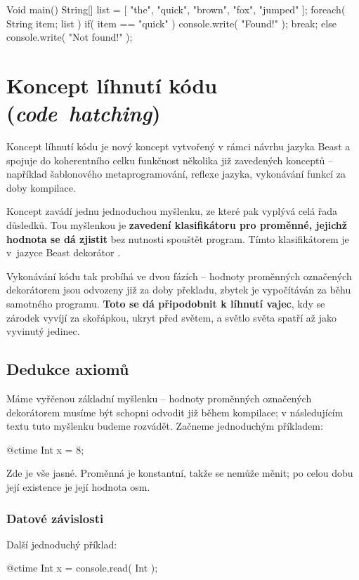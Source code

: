 \begin{code}
Void main() {
	String[] list = [ "the", "quick", "brown", "fox", "jumped" ];
	foreach( String item; list ) {
		if( item == "quick" )	{
			console.write( "Found!" );
			break;
		}
	} else
		console.write( "Not found!" );
}
\end{code}

\chapter{Koncept líhnutí kódu (\textit{code~hatching})} \label{ctime}
Koncept líhnutí kódu je nový koncept vytvořený v rámci návrhu jazyka Beast a spojuje do koherentního celku funkčnost několika již zavedených konceptů -- například šablonového metaprogramování, reflexe jazyka, vykonávání funkcí za doby kompilace.

Koncept zavádí jednu jednoduchou myšlenku, ze které pak vyplývá celá řada důsledků. Tou myšlenkou je \textbf{zavedení klasifikátoru pro proměnné, jejichž hodnota se dá zjistit} bez nutnosti spouštět program. Tímto klasifikátorem je v~jazyce Beast dekorátor \ctime.

Vykonávání kódu tak probíhá ve dvou fázích -- hodnoty proměnných označených dekorátorem \ctime jsou odvozeny již za doby překladu, zbytek je vypočítáván za běhu samotného programu. \textbf{Toto se dá připodobnit k líhnutí vajec}, kdy se zárodek vyvíjí za skořápkou, ukryt před světem, a světlo světa spatří až jako vyvinutý jedinec.

\section{Dedukce axiomů}
Máme vyřčenou základní myšlenku -- hodnoty proměnných označených dekorátorem \ctime musíme být schopni odvodit již během kompilace; v následujícím textu tuto myšlenku budeme rozvádět. Začneme jednoduchým příkladem:
\begin{code}
@ctime Int x = 8;
\end{code}

Zde je vše jasné. Proměnná je konstantní, takže se nemůže měnit; po celou dobu její existence je její hodnota osm.

\subsection{Datové závislosti} \label{ctimeDataDependency}
Další jednoduchý příklad:
\begin{code}
@ctime Int x = console.read( Int );
\end{code}

